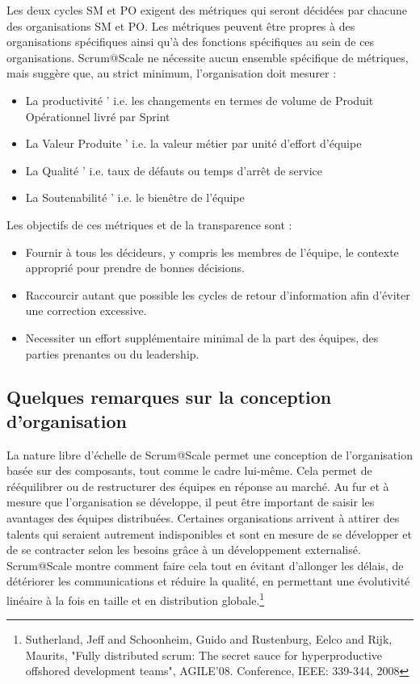 \documentclass[12pt,a4paper,parskip=full]{scrartcl}
\begin{document}
Les deux cycles SM et PO exigent des métriques qui seront décidées par chacune des
organisations SM et PO. Les métriques peuvent être propres à des organisations
spécifiques ainsi qu'à des fonctions spécifiques au sein de ces organisations.
Scrum@Scale ne nécessite aucun ensemble spécifique de métriques, mais suggère que,
au strict minimum, l'organisation doit mesurer :
\begin{itemize}
\item La productivité ' i.e. les changements en termes de volume de Produit
Opérationnel livré par Sprint
\item La Valeur Produite ' i.e. la valeur métier par unité d'effort d'équipe
\item La Qualité ' i.e. taux de défauts ou temps d'arrêt de service
\item La Soutenabilité ' i.e. le bienêtre de l'équipe
\end{itemize}
Les objectifs de ces métriques et de la transparence sont :
\begin{itemize}
  \item Fournir à tous les décideurs, y compris les membres de l'équipe, le contexte
approprié pour prendre de bonnes décisions.
\item Raccourcir autant que possible les cycles de retour d'information afin d'éviter
une correction excessive.
\item Necessiter un effort supplémentaire minimal de la part des équipes, des parties
prenantes ou du leadership.
 \end{itemize}

\subsection{Quelques remarques sur la conception d'organisation}
La nature libre d'échelle de Scrum@Scale permet une conception de l'organisation
basée sur des composants, tout comme le cadre lui-même. Cela permet de
rééquilibrer ou de restructurer des équipes en réponse au marché. Au fur et à mesure
que l'organisation se développe, il peut être important de saisir les avantages des
équipes distribuées. Certaines organisations arrivent à attirer des talents qui seraient
autrement indisponibles et sont en mesure de se développer et de se contracter selon
les besoins grâce à un développement externalisé. Scrum@Scale montre comment
faire cela tout en évitant d'allonger les délais, de détériorer les communications et
réduire la qualité, en permettant une évolutivité linéaire à la fois en taille et en
distribution globale.\footnote{Sutherland, Jeff and Schoonheim,
Guido and Rustenburg, Eelco and Rijk, Maurits, "Fully distributed scrum:
The secret sauce for hyperproductive offshored development teams",
AGILE'08. Conference, IEEE: 339-344, 2008}
\end{document}
